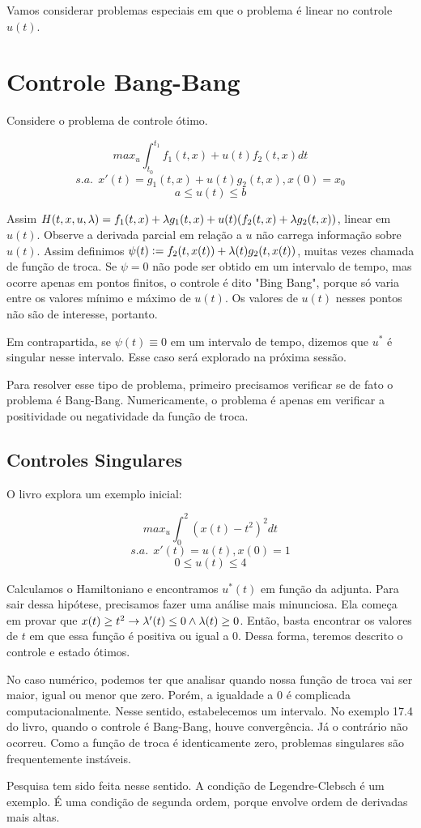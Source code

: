 Vamos considerar problemas especiais em que o problema é linear 
no controle $u(t)$. 

\section{Controle Bang-Bang}

Considere o problema de controle ótimo.

$$max_u \int_{t_0}^{t_1} f_1(t,x) + u(t)f_2(t,x) dt$$
$$s.a.~~x'(t) = g_1(t,x) + u(t)g_2(t,x), x(0) = x_0$$
$$ a \leq u(t) \leq b$$

Assim $H(t,x,u,\lambda) = f_1(t,x) + \lambda g_1(t,x) + u(t)(f_2(t,x) + \lambda g_2(t,x))$, 
linear em $u(t)$. Observe a derivada parcial em relação a $u$ não
carrega informação sobre $u(t)$. Assim definimos $\psi(t) := f_2(t,x(t)) + \lambda(t)g_2(t,x(t))$,
muitas vezes chamada de função de troca. Se $\psi = 0$ não pode ser obtido 
em um intervalo de tempo, mas ocorre apenas em pontos finitos, o controle
é dito "Bing Bang", porque só varia entre os valores mínimo e máximo de $u(t)$. 
Os valores de $u(t)$ nesses pontos não são de interesse, portanto. 

Em contrapartida, se $\psi(t) \equiv 0$ em um intervalo de tempo, dizemos que $u^*$ é 
singular nesse intervalo. Esse caso será explorado na próxima sessão. 

Para resolver esse tipo de problema, primeiro precisamos verificar se de fato 
o problema é Bang-Bang. Numericamente, o problema é apenas em verificar a positividade
ou negatividade da função de troca. 

\subsection{Controles Singulares}

O livro explora um exemplo inicial:

$$max_u \int_0^2 (x(t) - t^2)^2 dt $$
$$s.a. ~~ x'(t) = u(t), x(0) = 1$$
$$0 \leq u(t) \leq 4$$

Calculamos o Hamiltoniano e encontramos $u^*(t)$ em função da adjunta. 
Para sair dessa hipótese, precisamos fazer uma análise mais minunciosa. 
Ela começa em provar que $x(t) \geq t^2 \rightarrow \lambda'(t) \leq 0 \wedge \lambda(t) \geq 0$. 
Então, basta encontrar os valores de $t$ em que essa função é positiva 
ou igual a $0$. Dessa forma, teremos descrito o controle e estado ótimos.

No caso numérico, podemos ter que analisar quando nossa função de troca vai ser 
maior, igual ou menor que zero. Porém, a igualdade a $0$ é complicada computacionalmente. 
Nesse sentido, estabelecemos um intervalo. No exemplo 17.4 do livro, quando o controle é 
Bang-Bang, houve convergência. Já o contrário não ocorreu. Como a função de troca é 
identicamente zero, problemas singulares são frequentemente instáveis. 

Pesquisa tem sido feita nesse sentido. A condição de Legendre-Clebsch é um exemplo. É uma
condição de segunda ordem, porque envolve ordem de derivadas mais altas.